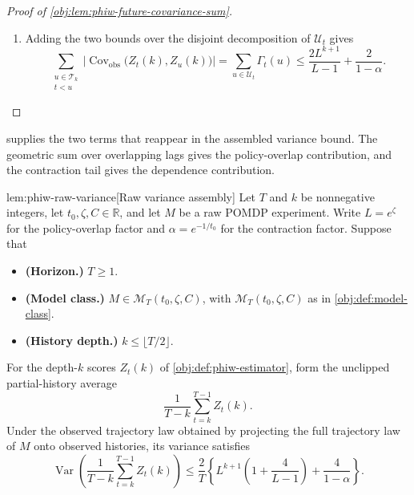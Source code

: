 \documentclass[11pt]{article}
\begin{document}
\begin{proof}[Proof of \cref{obj:lem:phiw-future-covariance-sum}]
\begin{enumerate}
\item Adding the two bounds over the disjoint decomposition of \(\mathscr U_t\) gives
\[
\sum_{\substack{u\in\mathscr T_k\\ t<u}}
\bigl|\operatorname{Cov}_{\mathrm{obs}}\bigl(Z_t(k),Z_u(k)\bigr)\bigr|
=
\sum_{u\in\mathscr U_t}\Gamma_t(u)
\le
\frac{2L^{k+1}}{L-1}+\frac{2}{1-\alpha}.
\]
\end{enumerate}
\end{proof}

 supplies the two terms that reappear in the assembled variance bound. The geometric sum over overlapping lags gives the policy-overlap contribution, and the contraction tail gives the dependence contribution.

\begin{lemmav}{lem:phiw-raw-variance}[Raw variance assembly]
Let \(T\) and \(k\) be nonnegative integers, let \(t_0,\zeta,C\in\mathbb R\), and let \(M\) be a raw POMDP experiment. Write \(L=e^\zeta\) for the policy-overlap factor and \(\alpha=e^{-1/t_0}\) for the contraction factor. Suppose that
\begin{itemize}
\item \textbf{(Horizon.)} \(T\ge 1\).
\item \textbf{(Model class.)} \(M\in\mathcal M_T(t_0,\zeta,C)\), with \(\mathcal M_T(t_0,\zeta,C)\) as in \cref{obj:def:model-class}.
\item \textbf{(History depth.)} \(k\le \lfloor T/2\rfloor\).
\end{itemize}
For the depth-\(k\) scores \(Z_t(k)\) of \cref{obj:def:phiw-estimator}, form the unclipped partial-history average
\[
\frac{1}{T-k}\sum_{t=k}^{T-1} Z_t(k).
\]
Under the observed trajectory law obtained by projecting the full trajectory law of \(M\) onto observed histories, its variance satisfies
\[
\operatorname{Var}\!\left(\frac{1}{T-k}\sum_{t=k}^{T-1} Z_t(k)\right)
\le
\frac{2}{T}\left\{
L^{k+1}\left(1+\frac{4}{L-1}\right)
+
\frac{4}{1-\alpha}
\right\}.
\]
\end{lemmav}
\end{document}
